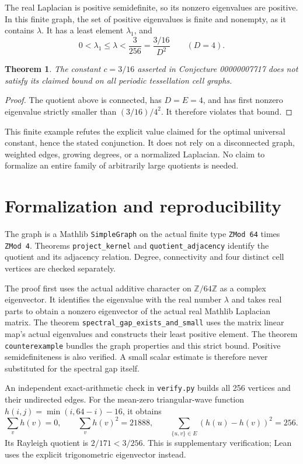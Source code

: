 \documentclass[11pt]{article}
\newtheorem{theorem}{Theorem}
\begin{document}
The real Laplacian is positive semidefinite, so its
nonzero eigenvalues are positive. In this finite graph,
the set of positive eigenvalues is finite and nonempty,
as it contains $\lambda$. It has a least element
$\lambda_1$, and
\[
 0<\lambda_1\leq\lambda<\frac3{256}
       =\frac{3/16}{D^2}\qquad(D=4).
\]
\begin{theorem}
The constant $c=3/16$ asserted in Conjecture 00000007717
does not satisfy its claimed bound on all periodic
tessellation cell graphs.
\end{theorem}
\begin{proof}
The quotient above is connected, has $D=E=4$, and has
first nonzero eigenvalue strictly smaller than
$(3/16)/4^2$. It therefore violates that bound.
\end{proof}

This finite example refutes the explicit value claimed
for the optimal universal constant, hence the stated
conjunction. It does not rely on a disconnected graph,
weighted edges, growing degrees, or a normalized
Laplacian. No claim to formalize an entire family of
arbitrarily large quotients is needed.

\newpage
\section*{Formalization and reproducibility}
The graph is a Mathlib \texttt{SimpleGraph} on the actual
finite type \texttt{ZMod 64} times \texttt{ZMod 4}.
Theorems \texttt{project\_kernel} and
\texttt{quotient\_adjacency} identify the quotient and its
adjacency relation. Degree, connectivity and four distinct
cell vertices are checked separately.

The proof first uses the actual additive character on
$\mathbb Z/64\mathbb Z$ as a complex eigenvector. It
identifies the eigenvalue with the real number $\lambda$
and takes real parts to obtain a nonzero eigenvector
of the actual real Mathlib Laplacian matrix.
The theorem \texttt{spectral\_gap\_exists\_and\_small}
uses the matrix linear map's actual eigenvalues and
constructs their least positive element. The theorem
\texttt{counterexample} bundles the graph properties and
this strict bound. Positive semidefiniteness is also
verified. A small scalar estimate is therefore never
substituted for the spectral gap itself.

An independent exact-arithmetic check in
\texttt{verify.py} builds all 256 vertices and their
undirected edges. For the mean-zero triangular-wave
function $h(i,j)=\min(i,64-i)-16$, it obtains
\[
 \sum_v h(v)=0,\qquad \sum_v h(v)^2=21888,
 \qquad \sum_{\{u,v\}\in E}(h(u)-h(v))^2=256.
\]
Its Rayleigh quotient is $2/171<3/256$.
This is supplementary verification; Lean uses the
explicit trigonometric eigenvector instead.
\end{document}
